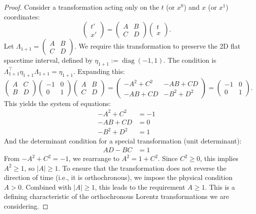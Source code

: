 \documentclass{amsart}
\theoremstyle{definition}
\theoremstyle{remark}
\DeclareMathOperator{\diag}{diag}
\begin{document}
\begin{proof}
  Consider a transformation acting only on the $t$ (or $x^0$) and $x$ (or $x^1$) coordinates:
  \begin{equation*}
  \begin{pmatrix} t' \\ x' \end{pmatrix} = \begin{pmatrix} A & B \\ C & D \end{pmatrix} \begin{pmatrix} t \\ x \end{pmatrix}.
  \end{equation*}
  Let $\Lambda_{1+1} = \begin{pmatrix} A & B \\ C & D \end{pmatrix}$. We require this transformation to preserve the 2D flat spacetime interval, defined by $\eta_{1+1} := \diag(-1, 1)$. The condition is $\Lambda_{1+1}^\top \eta_{1+1} \Lambda_{1+1} = \eta_{1+1}$.
  Expanding this:
  \begin{equation*}
  \begin{pmatrix} A & C \\ B & D \end{pmatrix}
  \begin{pmatrix} -1 & 0 \\ 0 & 1 \end{pmatrix}
  \begin{pmatrix} A & B \\ C & D \end{pmatrix}
  =
  \begin{pmatrix} -A^2 + C^2 & -AB + CD \\ -AB + CD & -B^2 + D^2 \end{pmatrix}
  =
  \begin{pmatrix} -1 & 0 \\ 0 & 1 \end{pmatrix}.
  \end{equation*}
  This yields the system of equations:
  \begin{align*}
    -A^2 + C^2 &= -1  \\ 
    -AB + CD &= 0  \\ 
    -B^2 + D^2 &= 1 
  \end{align*}
  And the determinant condition for a special transformation (unit determinant):
  \begin{align*}
    AD-BC &= 1 
  \end{align*}
  From $-A^2 + C^2 = -1$, we rearrange to $A^2 = 1 + C^2$. Since $C^2 \geq 0$, this implies $A^2 \geq 1$, so $|A| \geq 1$.
  To ensure that the transformation does not reverse the direction of time (i.e., it is orthochronous), we impose the physical condition $A > 0$. Combined with $|A| \geq 1$, this leads to the requirement $A \geq 1$. This is a defining characteristic of the orthochronous Lorentz transformations we are considering.


\end{proof}
\end{document}
